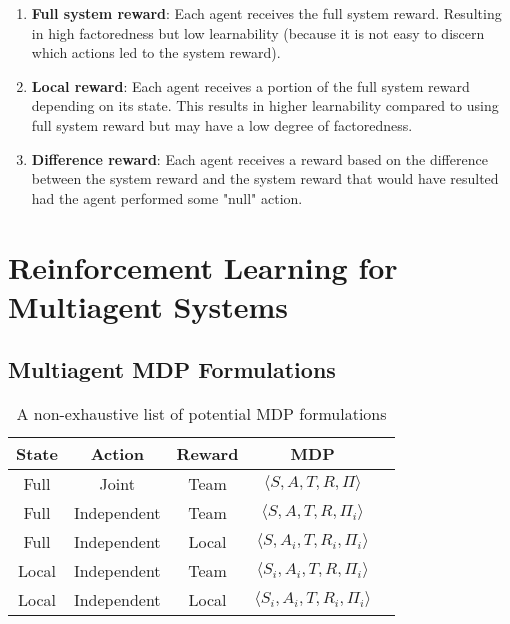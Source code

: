 \documentclass[twocolumn]{article}
\theoremstyle{plain}
\begin{document}
\begin{enumerate}
    \item \textbf{Full system reward}: Each agent receives the full system reward. Resulting in high factoredness but low learnability (because it is not easy to discern which actions led to the system reward).
    \item \textbf{Local reward}: Each agent receives a portion of the full system reward depending on its state. This results in higher learnability compared to using full system reward but may have a low degree of factoredness.
    \item \textbf{Difference reward}: Each agent receives a reward based on the difference between the system reward and the system reward that would have resulted had the agent performed some "null" action.
\end{enumerate}

\vfill\eject

\section{Reinforcement Learning for Multiagent Systems}

\subsection{Multiagent MDP Formulations}

\begin{table}[h]
    \centering
\begin{tabular}{|c|c|c|c|c|}
\hline
    \textbf{State} &  \textbf{Action} & \textbf{Reward} & \textbf{MDP} \\ \hline
    Full &      Joint &         Team &  $\langle S, A, T, R, \Pi \rangle$ \\ \hline
    Full &      Independent &   Team &  $\langle S, A, T, R, \Pi_i \rangle$       \\ \hline
    Full &      Independent &   Local & $\langle S, A_i, T, R_i, \Pi_i \rangle$       \\ \hline
    Local &     Independent &   Team &  $\langle S_i, A_i, T, R, \Pi_i \rangle$        \\ \hline
    Local &     Independent &   Local & $\langle S_i, A_i, T, R_i, \Pi_i \rangle$        \\ \hline
\end{tabular}
    \caption{A non-exhaustive list of potential MDP formulations}
\end{table}
\end{document}
